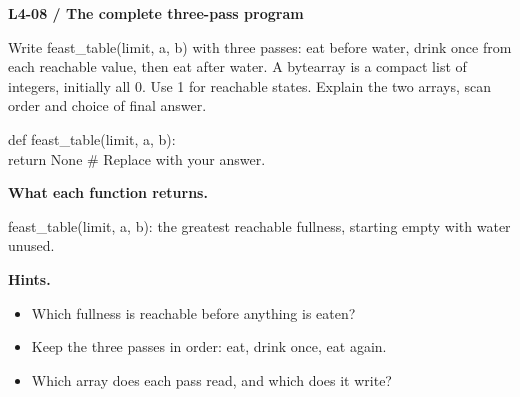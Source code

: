 \documentclass[11pt,a4paper]{article}
\begin{document}
\par\noindent\begin{minipage}{\linewidth}
\textbf{L4-08 / The complete three-pass program}\par\smallskip Write feast\_table(limit, a, b) with three passes: eat before water, drink once from each reachable value, then eat after water. A bytearray is a compact list of integers, initially all 0. Use 1 for reachable states. Explain the two arrays, scan order and choice of final answer.\par
\par{}\par\smallskip\noindent\colorbox{codepaper}{\parbox{\dimexpr\linewidth-2\fboxsep\relax}{\small\ttfamily\raggedright def feast\_table(limit, a, b):\\\hspace*{2.4em}return None  \# Replace with your answer.}}\par
{\small\textbf{What each function returns.}\par feast\_table(limit, a, b): the greatest reachable fullness, starting empty with water unused.\par }
{\small\textbf{Hints.}}\begin{itemize}\item Which fullness is reachable before anything is eaten?\item Keep the three passes in order: eat, drink once, eat again.\item Which array does each pass read, and which does it write?\end{itemize}
\end{minipage}\par\vspace{4mm}
\end{document}

